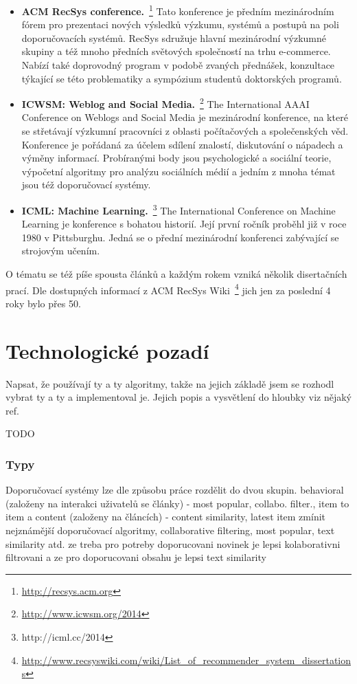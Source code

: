 \documentclass[thesis=M,czech]{FITthesis}[2014/05/07]
\begin{document}
\begin{itemize}
  \item \textbf{ACM RecSys conference.}~\footnote{\url{http://recsys.acm.org}} Tato konference je předním mezinárodním fórem pro prezentaci nových výsledků výzkumu, systémů a postupů na poli doporučovacích systémů. RecSys sdružuje hlavní mezinárodní výzkumné skupiny a též mnoho předních světových společností na trhu e-commerce. Nabízí také doprovodný program v podobě zvaných přednášek, konzultace týkající se této problematiky a sympózium studentů doktorských programů. 
  \item \textbf{ICWSM: Weblog and Social Media.}~\footnote{\url{http://www.icwsm.org/2014}} The International AAAI Conference on Weblogs and Social Media je mezinárodní konference, na které se střetávají výzkumní pracovníci z oblasti počítačových a společenských věd. Konference je pořádaná za účelem sdílení znalostí, diskutování o nápadech a výměny informací. Probíranými body jsou psychologické a sociální teorie, výpočetní algoritmy pro analýzu sociálních médií a jedním z mnoha témat jsou též doporučovací systémy.
  \item \textbf{ICML: Machine  Learning.}~\footnote{http://icml.cc/2014} The International Conference on Machine Learning je konference s bohatou historií. Její první ročník proběhl již v roce 1980 v Pittsburghu. Jedná se o přední mezinárodní konferenci zabývající se strojovým učením. 
\end{itemize}

O tématu se též píše spousta článků a každým rokem vzniká několik disertačních prací. Dle dostupných informací z ACM RecSys Wiki~\footnote{\url{http://www.recsyswiki.com/wiki/List_of_recommender_system_dissertations}} jich jen za poslední 4 roky bylo přes 50. 

\section{Technologické pozadí}
Napsat, že používají ty a ty algoritmy, takže na jejich základě jsem se rozhodl vybrat ty a ty a implementoval je. Jejich popis a vysvětlení do hloubky viz nějaký ref.

TODO
	\subsubsection{Typy}
Doporučovací systémy lze dle způsobu práce rozdělit do dvou skupin. 
	behavioral (založeny na interakci uživatelů se články) - most popular, collabo. filter., item to item a content (založeny na článcích) - content similarity, latest item
	zmínit nejznámější doporučovací algoritmy, collaborative filtering, most popular, text similarity atd.
	ze treba pro potreby doporucovani novinek je lepsi kolaborativni filtrovani a ze pro doporucovani obsahu je lepsi text similarity
\end{document}

